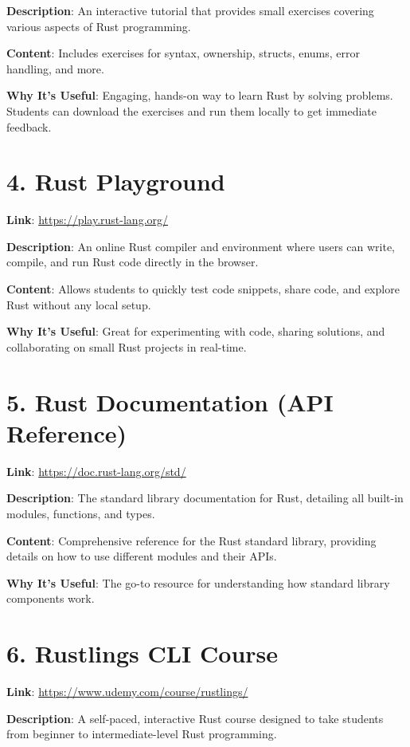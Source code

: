 \documentclass[12pt]{article}
\begin{document}
	\textbf{Description}: An interactive tutorial that provides small exercises covering various aspects of Rust programming.
	
	\textbf{Content}: Includes exercises for syntax, ownership, structs, enums, error handling, and more.
	
	\textbf{Why It’s Useful}: Engaging, hands-on way to learn Rust by solving problems. Students can download the exercises and run them locally to get immediate feedback.
	
	\section*{4. Rust Playground}
	\textbf{Link}: \href{https://play.rust-lang.org/}{https://play.rust-lang.org/}
	
	\textbf{Description}: An online Rust compiler and environment where users can write, compile, and run Rust code directly in the browser.
	
	\textbf{Content}: Allows students to quickly test code snippets, share code, and explore Rust without any local setup.
	
	\textbf{Why It’s Useful}: Great for experimenting with code, sharing solutions, and collaborating on small Rust projects in real-time.
	
	\section*{5. Rust Documentation (API Reference)}
	\textbf{Link}: \href{https://doc.rust-lang.org/std/}{https://doc.rust-lang.org/std/}
	
	\textbf{Description}: The standard library documentation for Rust, detailing all built-in modules, functions, and types.
	
	\textbf{Content}: Comprehensive reference for the Rust standard library, providing details on how to use different modules and their APIs.
	
	\textbf{Why It’s Useful}: The go-to resource for understanding how standard library components work.
	
	\section*{6. Rustlings CLI Course}
	\textbf{Link}: \href{https://www.udemy.com/course/rustlings/}{https://www.udemy.com/course/rustlings/}
	
	\textbf{Description}: A self-paced, interactive Rust course designed to take students from beginner to intermediate-level Rust programming.
	
\end{document}
